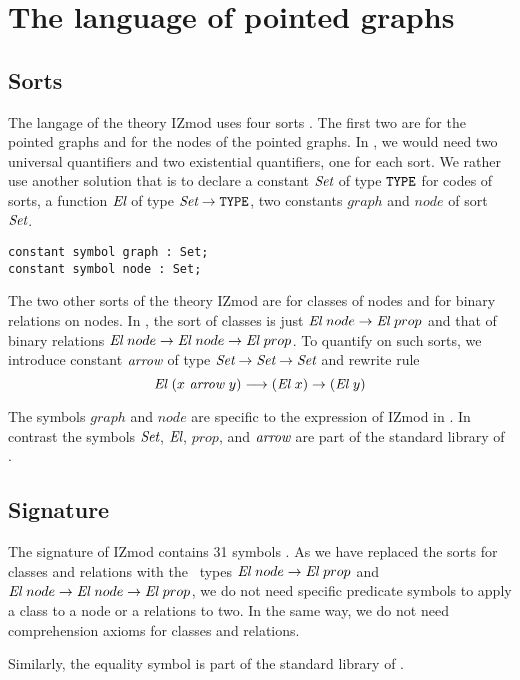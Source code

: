 \documentclass[a4paper]{article}
\begin{document}
\section{The language of pointed graphs}

\subsection{Sorts}

The langage of the theory IZmod uses four sorts \cite[see][Section 3.2]{zermodulo}. The first two are for
the pointed graphs and for the nodes of the pointed graphs.  In
\dedukti, we would need two universal quantifiers and two
existential quantifiers, one for each sort.  We rather use another
solution \cite{theoryU} that is to declare a constant $\mbox{\it Set}$ of type
$\mbox{\tt TYPE}$ for codes of sorts, a function ${\mbox{\it El}}$ of type $\mbox{\it Set} \rightarrow \mbox{\tt TYPE}$,
two constants $graph$ and $node$ of sort $\mbox{\it Set}$.

\begin{lstlisting}
constant symbol graph : Set;
constant symbol node : Set;
\end{lstlisting}

The two other sorts of the theory IZmod are for classes of nodes and
for binary relations on nodes.  In \dedukti, the sort of classes is
just ${\mbox{\it El}}~node \rightarrow {\mbox{\it El}}~prop$ and that of binary relations
${\mbox{\it El}}~node \rightarrow {\mbox{\it El}}~node \rightarrow {\mbox{\it El}}~prop$. To quantify on such sorts, we introduce constant ${\mbox{\it arrow}} $ of type
$\mbox{\it Set} \rightarrow \mbox{\it Set} \rightarrow \mbox{\it Set}$ and rewrite rule
$${\mbox{\it El}}~(x~{\mbox{\it arrow}}~y) \longrightarrow ({\mbox{\it El}}~x) \rightarrow ({\mbox{\it El}}~y)$$

The symbols $graph$ and $node$ are specific to the
expression of IZmod in \dedukti. In contrast the symbols $\mbox{\it Set}$,
${\mbox{\it El}}$, $prop$, and ${\mbox{\it arrow}}$ are part of the standard library of 
\dedukti.

\subsection{Signature}

The signature of IZmod contains 31 symbols \cite[see][Table 2]{zermodulo}. As we have replaced the
sorts for classes and relations with the \dedukti \ types
${\mbox{\it El}}~node \rightarrow {\mbox{\it El}}~prop$ and ${\mbox{\it El}}~node \rightarrow {\mbox{\it El}}~node \rightarrow {\mbox{\it El}}~prop$, we do not need specific predicate symbols to apply a class to a node or a relations to two. In the same way, we do not need comprehension axioms for classes and relations. 

Similarly, the equality symbol is part of the standard library of \dedukti.
\end{document}
